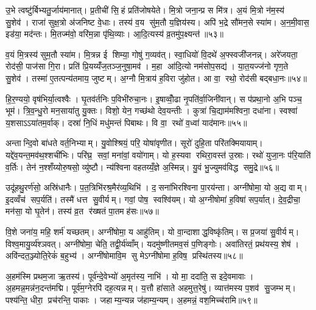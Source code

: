 उ॒भे त्वष्टु॑र्बिभ्यतु॒र्जाय॑मानात्। प्र॒तीची॑ सि॒हं प्रति॑जोषयेते। मि॒त्रो जना॒न्प्र स मि॑त्र। अ॒यं मि॒त्रो न॑म॒स्य॑ सु॒शेव॑। राजा॑ सुक्ष॒त्रो अ॑जनिष्ट वे॒धाः। तस्य॑ व॒य सु॑म॒तौ य॒ज्ञिय॑स्य। अपि॑ भ॒द्रे सौ॑मन॒से स्या॑म। अ॒न॒मी॒वास॒ इड॑या॒ मद॑न्तः। मि॒तज्म॑वो॒ वरि॑म॒न्ना पृ॑थि॒व्याः। आ॒दि॒त्यस्य॑ व्र॒तमु॑प॒क्ष्यन्त॑॥५३॥

व॒यं मि॒त्रस्य॑ सुम॒तौ स्या॑म। मि॒त्रन्न ई शिम्या॒ गोषु॑ ग॒व्यव॑त्। स्वा॒धियो॑ वि॒दथे॑ अ॒फ्स्वजी॑जनन्न्। अरे॑जयता॒ रोद॑सी॒ पाज॑सा गि॒रा। प्रति॑ प्रि॒यय्यँ॑ज॒तञ्ज॒नुषा॒मव॑। म॒हा आ॑दि॒त्यो नम॑सोप॒सद्य॑। या॒त॒यज्ज॑नो गृण॒ते सु॒शेव॑। तस्मा॑ ए॒तत्पन्य॑तमाय॒ जुष्टम्। अ॒ग्नौ मि॒त्राय॑ ह॒विरा जु॑होत। आ वा॒ रथो॒ रोद॑सी बद्बधा॒नः॥५४॥

हि॒र॒ण्ययो॒ वृष॑भिर्या॒त्वश्वैः। घृ॒तव॑र्तनिः प॒विभी॑रुचा॒नः। इ॒षाव्वोँ॒ढा नृ॒पति॑र्वा॒जिनी॑वान्। स प॑प्रथा॒नो अ॒भि पञ्च॒ भूम॑। त्रि॒व॒न्धु॒रो मन॒साया॑तु यु॒क्तः। विशो॒ येन॒ गच्छ॑थो देव॒यन्तीः। कुत्रा॑ चि॒द्याम॑मश्विना॒ दधा॑ना। स्वश्वा॑ य॒शसाऽऽया॑तम॒र्वाक्। दस्रा॑ नि॒धिं मधु॑मन्तं पिबाथः। वि वा॒ रथो॑ व॒ध्वा॑ याद॑मानः॥५५॥

अन्तान्दि॒वो बा॑धते वर्त॒निभ्याम्। यु॒वोश्श्रियं॒ परि॒ योषा॑वृणीत। सूरो॑ दुहि॒ता परि॑तक्मियायाम्। यद्दे॑व॒यन्त॒मव॑थ॒श्शची॑भिः। परि॑घ्र॒ सवां॒ मना॑वां॒ वयो॑गाम्। यो ह॒स्यवा रथिरा॒वस्त॑ उ॒स्राः। रथो॑ युजा॒नः प॑रि॒याति॑ व॒र्तिः। तेन॑ न॒श्शँय्योरु॒षसो॒ व्यु॑ष्टौ। न्य॑श्विना वहतय्यँ॒ज्ञे अ॒स्मिन्न्। यु॒वं भु॒ज्युमव॑विद्ध समु॒द्रे॥५६॥

उदू॑हथु॒रर्ण॑सो॒ अस्रि॑धानैः। प॒त॒त्रिभि॑रश्र॒मैर॑व्य॒थिभि॑। द॒सना॑भिरश्विना पा॒रय॑न्ता। अग्नी॑षोमा॒ यो अ॒द्य वाम्। इ॒दव्वँच॑ सप॒र्यति॑। तस्मै॑ धत्त सु॒वीर्यम्। गवां॒ पोष॒ स्वश्वि॑यम्। यो अ॒ग्नीषोमा॑ ह॒विषा॑ सप॒र्यात्। दे॒व॒द्रीचा॒ मन॑सा॒ यो घृ॒तेन॑। तस्य॑ व्र॒त र॑ख्षतं पा॒तमह॑सः॥५७॥

वि॒शे जना॑य॒ महि॒ शर्म॑ यच्छतम्। अग्नी॑षोमा॒ य आहु॑तिम्। यो वा॒न्दाशाद्ध॒विष्कृ॑तिम्। स प्र॒जया॑ सु॒वीर्यम्। विश्व॒मायु॒र्व्य॑श्ञवत्। अग्नी॑षोमा॒ चेति॒ तद्वी॒र्य॑व्वाँम्। यदमु॑ष्णीतमव॒सं प॒णिङ्गोः। अवा॑तिरतं॒ प्रथ॑यस्य॒ शेष॑। अवि॑न्दत॒ञ्ज्योति॒रेकं॑ ब॒हुभ्य॑। अग्नी॑षोमावि॒म सु मेऽग्नी॑षोमा ह॒विष॒ प्रस्थि॑तस्य॥५८॥\anuvakamend[ज॒भा॒र॒ द्यौर॒ग्नेरु॒पस्थ॑ उप॒क्ष्यन्तो॑ बद्बधा॒नो व॒ध्वा॑ याद॑मानस्समु॒द्रेऽह॑स॒ प्रस्थि॑तस्य]

अ॒हम॑स्मि प्रथम॒जा ऋ॒तस्य॑। पूर्व॑न्दे॒वेभ्यो॑ अ॒मृत॑स्य॒ नाभि॑। यो मा॒ ददा॑ति॒ स इदे॒वमावाः। अ॒हमन्न॒मन्न॑न॒दन्त॑मद्मि। पूर्व॑म॒ग्नेरपि॑ दह॒त्यन्नम्। य॒त्तौ हा॑साते अहमुत्त॒रेषु॑। व्यात्त॑मस्य प॒शव॑ सु॒जम्भम्। पश्य॑न्ति॒ धीरा॒ प्रच॑रन्ति॒ पाकाः। जहाम्य॒न्यन्न ज॑हाम्य॒न्यम्। अ॒हमन्नं॒ वश॒मिच्च॑रामि॥५९॥

